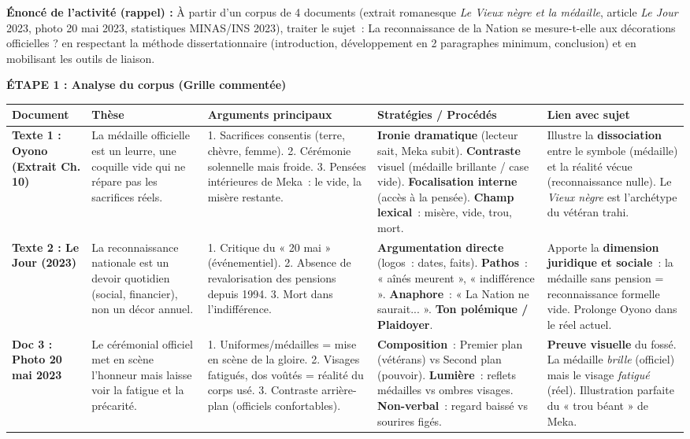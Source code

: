 \documentclass[11pt]{article}
\begin{document}
\begin{exoresolu}
\textbf{Énoncé de l'activité (rappel) :} À partir d'un corpus de 4 documents (extrait romanesque \emph{Le Vieux nègre et la médaille}, article \emph{Le Jour} 2023, photo 20 mai 2023, statistiques MINAS/INS 2023), traiter le sujet~: \og La reconnaissance de la Nation se mesure-t-elle aux décorations officielles ? \fg en respectant la méthode dissertationnaire (introduction, développement en 2 paragraphes minimum, conclusion) et en mobilisant les outils de liaison.

\tcblower

\textbf{ÉTAPE 1 : Analyse du corpus (Grille commentée)}

\begin{center}
\begin{tabularx}{\linewidth}{|l|X|X|X|X|}\hline
\rowcolor{popblueL} \textbf{Document} & \textbf{Thèse} & \textbf{Arguments principaux} & \textbf{Stratégies / Procédés} & \textbf{Lien avec sujet} \\ \hline
\textbf{Texte 1 : Oyono (Extrait Ch. 10)} & La médaille officielle est un leurre, une coquille vide qui ne répare pas les sacrifices réels. & 1. Sacrifices consentis (terre, chèvre, femme). 2. Cérémonie solennelle mais froide. 3. Pensées intérieures de Meka~: le vide, la misère restante. & \textbf{Ironie dramatique} (lecteur sait, Meka subit). \textbf{Contraste} visuel (médaille brillante / case vide). \textbf{Focalisation interne} (accès à la pensée). \textbf{Champ lexical}~: misère, vide, trou, mort. & Illustre la \textbf{dissociation} entre le symbole (médaille) et la réalité vécue (reconnaissance nulle). Le \emph{Vieux nègre} est l'archétype du vétéran trahi. \\ \hline
\textbf{Texte 2 : Le Jour (2023)} & La reconnaissance nationale est un devoir quotidien (social, financier), non un décor annuel. & 1. Critique du « 20 mai » (événementiel). 2. Absence de revalorisation des pensions depuis 1994. 3. Mort dans l'indifférence. & \textbf{Argumentation directe} (logos~: dates, faits). \textbf{Pathos}~: « aînés meurent », « indifférence ». \textbf{Anaphore}~: « La Nation ne saurait... ». \textbf{Ton polémique / Plaidoyer}. & Apporte la \textbf{dimension juridique et sociale}~: la médaille sans pension = reconnaissance formelle vide. Prolonge Oyono dans le réel actuel. \\ \hline
\textbf{Doc 3 : Photo 20 mai 2023} & Le cérémonial officiel met en scène l'honneur mais laisse voir la fatigue et la précarité. & 1. Uniformes/médailles = mise en scène de la gloire. 2. Visages fatigués, dos voûtés = réalité du corps usé. 3. Contraste arrière-plan (officiels confortables). & \textbf{Composition}~: Premier plan (vétérans) vs Second plan (pouvoir). \textbf{Lumière}~: reflets médailles vs ombres visages. \textbf{Non-verbal}~: regard baissé vs sourires figés. & \textbf{Preuve visuelle} du fossé. La médaille \emph{brille} (officiel) mais le visage \emph{fatigué} (réel). Illustration parfaite du « trou béant » de Meka. \\ \hline

\end{tabularx}
\end{center}
\end{exoresolu}
\end{document}
